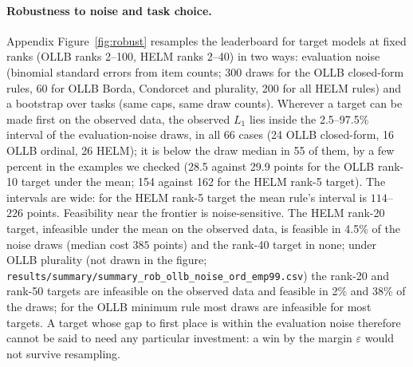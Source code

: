 \documentclass{article}
\begin{document}
\paragraph{Robustness to noise and task choice.}
Appendix Figure~\ref{fig:robust} resamples the leaderboard for target models at fixed ranks (OLLB ranks 2--100, HELM ranks 2--40) in two ways: evaluation noise (binomial standard errors from item counts; 300 draws for the OLLB closed-form rules, 60 for OLLB Borda, Condorcet and plurality, 200 for all HELM rules) and a bootstrap over tasks (same caps, same draw counts). Wherever a target can be made first on the observed data, the observed $L_1$ lies inside the 2.5--97.5\% interval of the evaluation-noise draws, in all 66 cases (24 OLLB closed-form, 16 OLLB ordinal, 26 HELM); it is below the draw median in 55 of them, by a few percent in the examples we checked (28.5 against 29.9 points for the OLLB rank-10 target under the mean; 154 against 162 for the HELM rank-5 target). The intervals are wide: for the HELM rank-5 target the mean rule's interval is $114$--$226$ points. Feasibility near the frontier is noise-sensitive. The HELM rank-20 target, infeasible under the mean on the observed data, is feasible in 4.5\% of the noise draws (median cost $385$ points) and the rank-40 target in none; under OLLB plurality (not drawn in the figure; \texttt{results/summary/summary\_rob\_ollb\_noise\_ord\_emp99.csv}) the rank-20 and rank-50 targets are infeasible on the observed data and feasible in 2\% and 38\% of the draws; for the OLLB minimum rule most draws are infeasible for most targets. A target whose gap to first place is within the evaluation noise therefore cannot be said to need any particular investment: a win by the margin $\varepsilon$ would not survive resampling.
\end{document}
